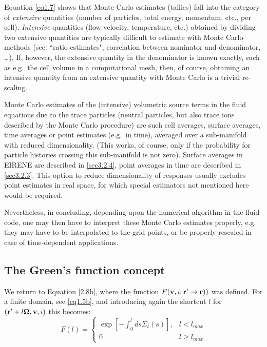 Equation \cref{eq1.7} shows that Monte Carlo estimates (tallies) fall into the
category of \emph{extensive} quantities (number of particles, total energy,
momentum, etc., per cell).
\emph{Intensive} quantities  (flow velocity, temperature, etc.) obtained by
dividing two extensive quantities are typically difficult to estimate with
Monte Carlo methods (see: ``ratio estimates", correlation between nominator and
denominator, \dots).
If, however, the extensive quantity in the denominator is known exactly, such
as e.g.\ the cell volume in a computational mesh, then, of course, obtaining an
intensive quantity from an extensive quantity with Monte Carlo is a trivial
re-scaling.

Monte Carlo estimates of the (intensive) volumetric source terms in the fluid
equations due to the trace particles (neutral particles, but also trace ions
described by the Monte Carlo procedure) are such cell averages, surface
averages, time averages or point estimates (e.g.\ in time), averaged over a
sub-manifold with reduced dimensionality.
(This works, of course, only if the probability for particle histories crossing
this sub-manifold is not zero).
Surface averages in EIRENE are described in \cref{sec3.2.4}, point averages in
time are described in \cref{sec3.2.3}.
This option to reduce dimensionality of responses usually excludes point
estimates in real space, for which special estimators not mentioned here would
be required.

Nevertheless, in concluding, depending upon the numerical algorithm in the
fluid code, one may then have to interpret these Monte Carlo estimates
properly, e.g. they may have to be interpolated to the grid points, or be
properly rescaled in case of time-dependent applications.

\subsection{The Green's function concept}\label{sec_green}

We return to Equation \cref{2.8b}, where the function $F(\mathbf{v},i;\mathbf{r}'\rightarrow
  \mathbf{r}))$ was defined.
For a finite domain, see \cref{eq1.5b}, and introducing again the shortcut $l$
for $(\mathbf{r}'+l\mathbf{\Omega},\mathbf{v},i)$ this becomes:
\begin{equation}
  F(l) = \left\{
  \begin{array}{lr} \exp \left [	- \int_{0}^{l} ds \Sigma_t ( s
    )  \right ], & l<l_{max} \\
    0            & l\ge
    l_{max}
  \end{array}
  \right.
\end{equation}

